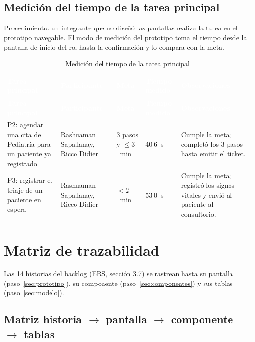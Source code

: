 \documentclass[11pt,a4paper]{article}
\newcommand{\cab}[1]{\textcolor{white}{\textbf{#1}}}
\begin{document}
\subsection{Medición del tiempo de la tarea principal}

Procedimiento: un integrante que no diseñó las pantallas realiza la tarea en el prototipo
navegable. El modo de medición del prototipo toma el tiempo desde la pantalla de inicio del rol
hasta la confirmación y lo compara con la meta.

\begin{xltabular}{\linewidth}{|L|P{2.6cm}|P{2cm}|P{2cm}|L|}
  \caption{Medición del tiempo de la tarea principal}\label{tab:tiempo}\\
  \hline
  \cab{Tarea principal} & \cab{Participante} & \cab{Meta} & \cab{Tiempo medido} & \cab{Observaciones} \\ \hline
  \endfirsthead
  \hline
  \cab{Tarea principal} & \cab{Participante} & \cab{Meta} & \cab{Tiempo medido} & \cab{Observaciones} \\ \hline
  \endhead
  P2: agendar una cita de Pediatría para un paciente ya registrado &
    Rashuaman Sapallanay, Ricco Didier & 3 pasos y $\leq 3$~min & 40.6~s &
    Cumple la meta; completó los 3 pasos hasta emitir el ticket. \\ \hline
  P3: registrar el triaje de un paciente en espera &
    Rashuaman Sapallanay, Ricco Didier & $< 2$~min & 53.0~s &
    Cumple la meta; registró los signos vitales y envió al paciente al consultorio. \\ \hline
\end{xltabular}

\newpage
\section{Matriz de trazabilidad}\label{sec:trazabilidad}

Las 14 historias del backlog (ERS, sección 3.7) se rastrean hasta su pantalla
(paso~\ref{sec:prototipo}), su componente (paso~\ref{sec:componentes}) y sus tablas
(paso~\ref{sec:modelo}).

\subsection{\texorpdfstring{Matriz historia $\rightarrow$ pantalla $\rightarrow$ componente $\rightarrow$ tablas}{Matriz historia, pantalla, componente y tablas}}
\end{document}
